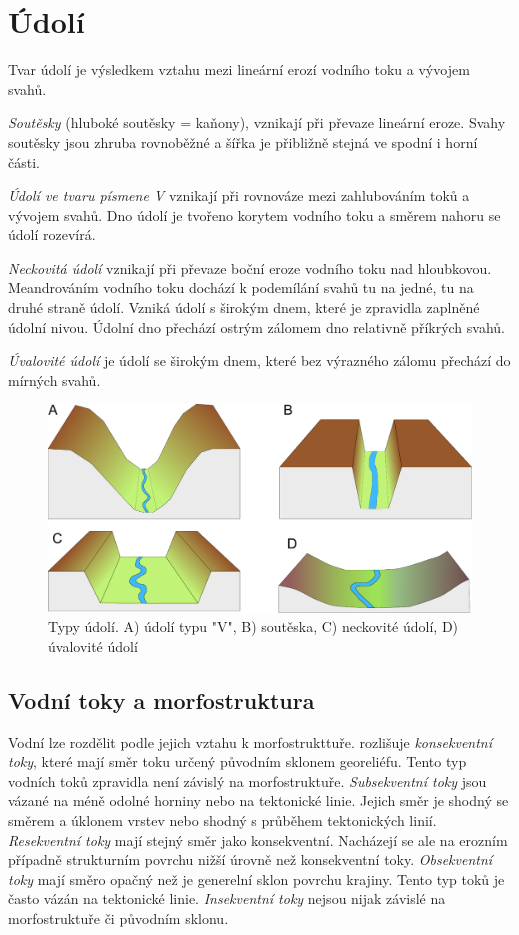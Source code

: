 \section{Údolí}

Tvar údolí je výsledkem vztahu mezi lineární erozí vodního toku a vývojem svahů.

\emph{Soutěsky} (hluboké soutěsky = kaňony), vznikají při převaze lineární eroze. Svahy soutěsky jsou zhruba rovnoběžné a šířka je přibližně stejná ve spodní i horní části.

\emph{Údolí ve tvaru písmene V} vznikají při rovnováze mezi zahlubováním toků a vývojem svahů. Dno údolí je tvořeno korytem vodního toku a směrem nahoru se údolí rozevírá. 

\emph{Neckovitá údolí} vznikají při převaze boční eroze vodního toku nad hloubkovou. Meandrováním vodního toku dochází k podemílání svahů tu na jedné, tu na druhé straně údolí. Vzniká údolí s širokým dnem, které je zpravidla zaplněné údolní nivou. Údolní dno přechází ostrým zálomem dno relativně příkrých svahů. 

\emph{Úvalovité údolí} je údolí se širokým dnem, které bez výrazného zálomu přechází do mírných svahů.

\begin{figure}[h]
	\centering
	\includegraphics[width=1\linewidth]{obrazky/fluvial/typy_udoli}
	\caption{Typy údolí. A) údolí typu "V", B) soutěska, C) neckovité údolí, D) úvalovité údolí}
	\label{fig:typyudoli}
\end{figure}

\subsection{Vodní toky a morfostruktura}
Vodní lze rozdělit podle jejich vztahu k morfostrukttuře. \textcite{demekObecnaGeomorfologie1987} rozlišuje \emph{konsekventní toky}, které mají směr toku určený původním sklonem georeliéfu. Tento typ vodních toků zpravidla není závislý na morfostruktuře. \emph{Subsekventní toky} jsou vázané na méně odolné horniny nebo na tektonické linie. Jejich směr je shodný se směrem a úklonem vrstev nebo shodný s průběhem tektonických linií. \emph{Resekventní toky} mají stejný směr jako konsekventní. Nacházejí se ale na erozním případně strukturním povrchu nižší úrovně než konsekventní toky. \emph{Obsekventní toky} mají směro opačný než je generelní sklon povrchu krajiny. Tento typ toků je často vázán na tektonické linie. \emph{Insekventní toky} nejsou nijak závislé na morfostruktuře či původním sklonu.

